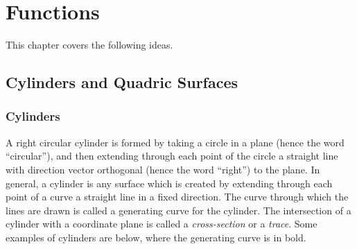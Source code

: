 
\chapter{Functions}

This chapter covers the following ideas. 




\section{Cylinders and Quadric Surfaces}

\subsection{Cylinders}
A right circular cylinder is formed by taking a circle in a plane
(hence the word ``circular''), and then extending through each point
of the circle a straight line with direction vector orthogonal (hence
the word ``right'') to the plane.  In general, a cylinder is any
surface which is created by extending through each point of a curve a
straight line in a fixed direction.  The curve through which the lines
are drawn is called a generating curve for the cylinder. The
intersection of a cylinder with a coordinate plane is called a
\emph{cross-section} or a \emph{trace}. Some examples of cylinders are
below, where the generating curve is in bold.
\newcommand{\mywidth}{1.0in}
